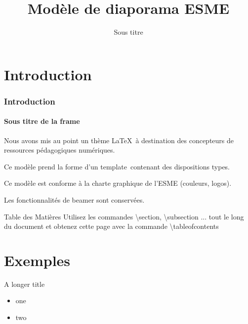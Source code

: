 \documentclass[aspectratio=169]{beamer}
\title{Modèle de diaporama ESME}
\subtitle{Sous titre}
\date[]{}
\author[]{}
\begin{document}
\begin{frame}
\titlepage
\end{frame}

\section{Introduction}


\begin{frame} 
\frametitle{Introduction} 
\framesubtitle{Sous titre de la frame} 

Nous avons mis au point un thème \LaTeX~à destination des concepteurs de 
ressources pédagogiques numériques.\newline

Ce modèle prend la forme d'un \og template\fg~contenant des 
dispositions types.\newline

Ce modèle est conforme à la charte graphique de l'ESME (couleurs, logos).\newline

Les fonctionnalités de beamer sont conservées.

\end{frame}

\begin{frame}{Table des Matières}
    \tableofcontents
    \scriptsize
    Utilisez les commandes \textbackslash section, \textbackslash subsection ...
    tout le long du document et obtenez cette page avec la commande 
    \textbackslash tableofcontents
\end{frame}


\section{Exemples}
\begin{frame}{A longer title}
\begin{itemize}
\item one
\item two
\end{itemize}
\end{frame}
\end{document}
